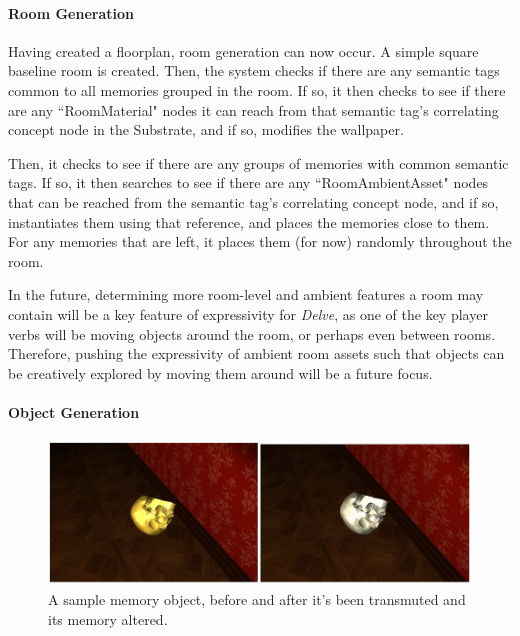 \paragraph{Room Generation}\label{par:delve-implementation-room-generation}

Having created a floorplan, room generation can now occur. A simple square baseline room is created. Then, the system checks if there are any semantic tags common to all memories grouped in the room. If so, it then checks to see if there are any ``RoomMaterial" nodes it can reach from that semantic tag's correlating concept node in the Substrate, and if so, modifies the wallpaper.

Then, it checks to see if there are any groups of memories with common semantic tags. If so, it then searches to see if there are any ``RoomAmbientAsset" nodes that can be reached from the semantic tag's correlating concept node, and if so, instantiates them using that reference, and places the memories close to them. For any memories that are left, it places them (for now) randomly throughout the room.

In the future, determining more room-level and ambient features a room may contain will be a key feature of expressivity for \textit{Delve}, as one of the key player verbs will be moving objects around the room, or perhaps even between rooms. Therefore, pushing the expressivity of ambient room assets such that objects can be creatively explored by moving them around will be a future focus.

\paragraph{Object Generation}\label{par:delve-implementation-object-generation}


\begin{figure}
    \centering
    \includegraphics[width=\textwidth]{figures/4-Delve/transmutation.jpg}
    \caption{A sample memory object, before and after it's been transmuted and its memory altered.}
    \label{fig:transmutation}
\end{figure}

